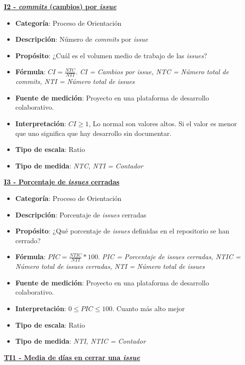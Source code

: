 \textbf{\underline{I2 - \textit{commits} (cambios) por \textit{issue}}}

\begin{itemize}
	\item \textbf{Categoría}: Proceso de Orientación
	\item \textbf{Descripción}: Número de \textit{commits} por \textit{issue}
	\item \textbf{Propósito}: ¿Cuál es el volumen medio de trabajo de las \textit{issues}?
	\item \textbf{Fórmula}: $CI = \frac{NTC}{NTI}$. \textit{CI = Cambios por \textit{issue}, NTC = Número total de \textit{commits}, NTI = Número total de \textit{issues}}
	\item \textbf{Fuente de medición}: Proyecto en una plataforma de desarrollo colaborativo.
	\item \textbf{Interpretación}: $CI \geq 1$, Lo normal son valores altos. Si el valor es menor que uno significa que hay desarrollo sin documentar.
	\item \textbf{Tipo de escala}: Ratio 
	\item \textbf{Tipo de medida}: \textit{NTC, NTI = Contador}
\end{itemize}

\textbf{\underline{I3 - Porcentaje de \textit{issues} cerradas}}

\begin{itemize}
	\item \textbf{Categoría}: Proceso de Orientación
	\item \textbf{Descripción}: Porcentaje de \textit{issues} cerradas
	\item \textbf{Propósito}: ¿Qué porcentaje de \textit{issues} definidas en el repositorio se han cerrado?
	\item \textbf{Fórmula}: $PIC = \frac{NTIC}{NTI}*100$. \textit{PIC = Porcentaje de \textit{issues} cerradas, NTIC = Número total de \textit{issues} cerradas, NTI = Número total de \textit{issues}}
	\item \textbf{Fuente de medición}: Proyecto en una plataforma de desarrollo colaborativo.
	\item \textbf{Interpretación}: $0 \leq PIC \leq 100$. Cuanto más alto mejor
	\item \textbf{Tipo de escala}: Ratio
	\item \textbf{Tipo de medida}: \textit{NTI, NTIC = Contador}
\end{itemize}

\textbf{\underline{TI1 - Media de días en cerrar una \textit{issue}}}

